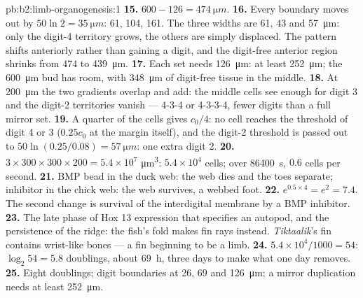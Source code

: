 \begin{solution}{pb:b2:limb-organogenesis:1}
\textbf{15.} $600 - 126 = \qty{474}{\micro m}$.
\textbf{16.} Every boundary moves out by $50\ln 2 = \qty{35}{\micro
m}$: 61, 104, 161. The three widths are 61, 43 and \qty{57}{\micro m}:
only the digit-4 territory grows, the others are simply displaced.
The pattern shifts anteriorly rather than gaining a digit, and the
digit-free anterior region shrinks from 474 to \qty{439}{\micro m}.
\textbf{17.} Each set needs \qty{126}{\micro m}: at least
\qty{252}{\micro m}; the \qty{600}{\micro m} bud has room, with
\qty{348}{\micro m} of digit-free tissue in the middle.
\textbf{18.} At \qty{200}{\micro m} the two gradients overlap and
add: the middle cells see enough for digit 3 and the digit-2
territories vanish --- 4-3-4 or 4-3-3-4, fewer digits than a full
mirror set.
\textbf{19.} A quarter of the cells gives $c_0/4$: no cell reaches
the threshold of digit 4 or 3 ($0.25 c_0$ at the margin itself), and
the digit-2 threshold is passed out to $50\ln(0.25/0.08) =
\qty{57}{\micro m}$: one extra digit 2.
\textbf{20.} $3\times 300\times 300\times 200 = 5.4\times 10^{7}$
\unit{\micro m^3}: $5.4\times 10^{4}$ cells; over \qty{86400}{s},
$0.6$ cells per second.
\textbf{21.} BMP bead in the duck web: the web dies and the toes
separate; inhibitor in the chick web: the web survives, a webbed
foot.
\textbf{22.} $e^{0.5\times 4} = e^{2} = 7.4$. The second change is
survival of the interdigital membrane by a BMP inhibitor.
\textbf{23.} The late phase of Hox 13 expression that specifies an
autopod, and the persistence of the ridge: the fish's fold makes fin
rays instead. \emph{Tiktaalik}'s fin contains wrist-like bones --- a
fin beginning to be a limb.
\textbf{24.} $5.4\times 10^{4}/1000 = 54$: $\log_2 54 = 5.8$ doublings,
about \qty{69}{h}, three days to make what one day removes.
\textbf{25.} Eight doublings; digit boundaries at 26, 69 and
\qty{126}{\micro m}; a mirror duplication needs at least
\qty{252}{\micro m}.
\end{solution}

